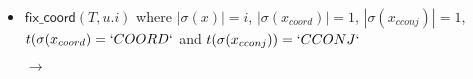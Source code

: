 \begin{itemize}


	\item $\textsf{fix\_coord}(T, u.i)$ where $|\sigma(x)| = i$, $|\sigma(x_{coord})| = 1$, $|\sigma(x_{cconj})| = 1$, $t(\sigma(x_{coord}) = `COORD`$ and $t(\sigma(x_{cconj})) = `CCONJ`$\\
	      \begin{center}
		      {\Large$\rightarrow$}
	      \end{center}


\end{itemize}
